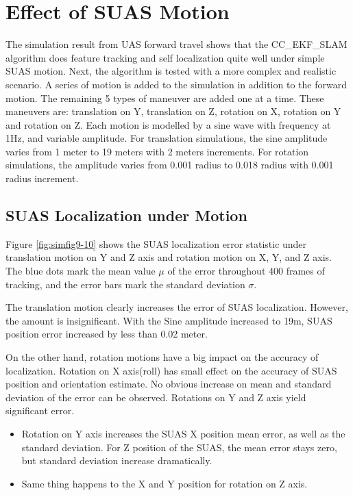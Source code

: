 \section{Effect of SUAS Motion}

The simulation result from UAS forward travel shows that the
CC\_EKF\_SLAM algorithm does feature tracking and self localization
quite well under simple SUAS motion. Next, the algorithm is tested with
a more complex and realistic scenario. A series of motion is added to
the simulation in addition to the forward motion. The remaining 5
types of maneuver are added one at a time. These maneuvers are:
translation on Y, translation on Z, rotation on X, rotation on Y and
rotation on Z. Each motion is modelled by a sine wave with frequency
at 1Hz, and variable amplitude. For translation simulations, the sine
amplitude varies from 1 meter to 19 meters with 2 meters increments.
For rotation simulations, the amplitude varies from 0.001 radius to
0.018 radius with 0.001 radius increment.

\subsection{SUAS Localization under Motion}

Figure \ref{fig:simfig9-10} shows the SUAS localization error statistic
under translation motion on Y and Z axis and rotation motion on X, Y,
and Z axis. The blue dots mark the mean value $\mu$ of the error
throughout 400 frames of tracking, and the error bars mark the standard
deviation $\sigma$.

The translation motion clearly increases the error of SUAS
localization. However, the amount is insignificant. With the Sine
amplitude increased to 19m, SUAS position error increased by less than
0.02 meter.

On the other hand, rotation motions have a big impact on the accuracy
of localization. Rotation on X axis(roll) has small effect on the
accuracy of SUAS position and orientation estimate. No obvious
increase on mean and standard deviation of the error can be observed.
Rotations on Y and Z axis yield significant error.

\begin{itemize}
  \item Rotation on Y axis increases the SUAS X position mean error, as
  well as the standard deviation. For Z position of the SUAS, the
  mean error stays zero, but standard deviation increase dramatically.
  \item Same thing happens to the X and Y position for rotation on
  Z axis.
\end{itemize}

